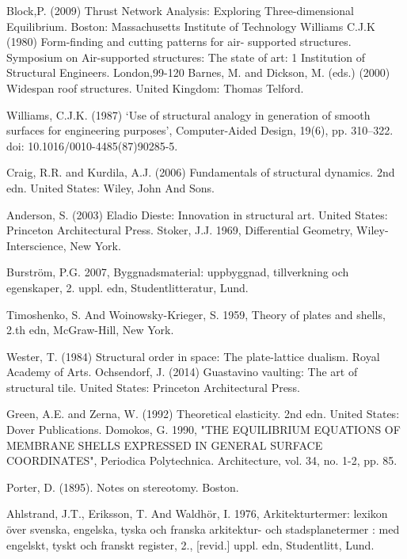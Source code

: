 \begin{thebibliography}{69}
 Block,P. (2009) Thrust Network Analysis: Exploring Three-dimensional Equilibrium. Boston: Massachusetts Institute of Technology 
 Williams C.J.K (1980) Form-finding and cutting patterns for air- supported structures. Symposium on Air-supported structures: The state of art: 1 Institution of Structural Engineers. London,99-120
Barnes, M. and Dickson, M. (eds.) (2000) Widespan roof structures. United Kingdom: Thomas Telford.

 Williams, C.J.K. (1987) ‘Use of structural analogy in generation of smooth surfaces for engineering purposes’, Computer-Aided Design, 19(6), pp. 310–322. doi: 10.1016/0010-4485(87)90285-5.

Craig, R.R. and Kurdila, A.J. (2006) Fundamentals of structural dynamics. 2nd edn. United States: Wiley, John And Sons.

Anderson, S. (2003) Eladio Dieste: Innovation in structural art. United States: Princeton Architectural Press.
 Stoker, J.J. 1969, Differential Geometry, Wiley-Interscience, New York.

Burström, P.G. 2007, Byggnadsmaterial: uppbyggnad, tillverkning och egenskaper, 2. uppl. edn, Studentlitteratur, Lund.

 Timoshenko, S. And Woinowsky-Krieger, S. 1959, Theory of plates and shells, 2.th edn, McGraw-Hill, New York.

Wester, T. (1984) Structural order in space: The plate-lattice dualism. Royal Academy of Arts.
 Ochsendorf, J. (2014) Guastavino vaulting: The art of structural tile. United States: Princeton Architectural Press.

Green, A.E. and Zerna, W. (1992) Theoretical elasticity. 2nd edn. United States: Dover Publications.
Domokos, G. 1990, "THE EQUILIBRIUM EQUATIONS OF MEMBRANE SHELLS EXPRESSED IN GENERAL SURFACE COORDINATES", Periodica Polytechnica. Architecture, vol. 34, no. 1-2, pp. 85.

Porter, D. (1895). Notes on stereotomy. Boston.

 Ahlstrand, J.T., Eriksson, T. And Waldhör, I. 1976, Arkitekturtermer: lexikon över svenska, engelska, tyska och franska arkitektur- och stadsplanetermer : med engelskt, tyskt och franskt register, 2., [revid.] uppl. edn, Studentlitt, Lund.


\end{thebibliography}

